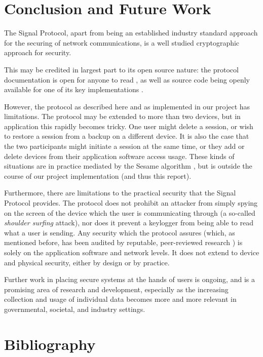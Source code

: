 \documentclass[12pt]{article}
\begin{document}
\section{Conclusion and Future Work}
The Signal Protocol, apart from being an established industry standard approach for the securing of network communications, is a well studied cryptographic approach for security. \parencite{formalAnalysisSig}\parencite{autoFormalAnalysisSig}
\par This may be credited in largest part to its open source nature: the protocol documentation is open for anyone to read \parencite{website:signal-docs}, as well as source code being openly available for one of its key implementations \parencite{website:sigOpenSource}. 
\par However, the protocol as described here and as implemented in our project has limitations. The protocol may be extended to more than two devices, but in application this rapidly becomes tricky. One user might delete a session, or wish to restore a session from a backup on a different device. It is also the case that the two participants might initiate a session at the same time, or they add or delete devices from their application software access usage. These kinds of situations are in practice mediated by the Sesame algorithm \parencite{website:sigSesame}, but is outside the course of our project implementation (and thus this report).
\par Furthermore, there are limitations to the practical security that the Signal Protocol provides. The protocol does not prohibit an attacker from simply spying on the screen of the device which the user is communicating through (a so-called \textit{shoulder surfing} attack), nor does it prevent a keylogger from being able to read what a user is sending. Any security which the protocol assures (which, as mentioned before, has been audited by reputable, peer-reviewed research \parencite{formalAnalysisSig}\parencite{autoFormalAnalysisSig}) is solely on the application software and network levels. It does not extend to device and physical security, either by design or by practice.
\par Further work in placing secure systems at the hands of users is ongoing, and is a promising area of research and development, especially as the increasing collection and usage of individual data becomes more and more relevant in governmental, societal, and industry settings.




\newpage
\section{Bibliography}
\printbibliography
\end{document}
